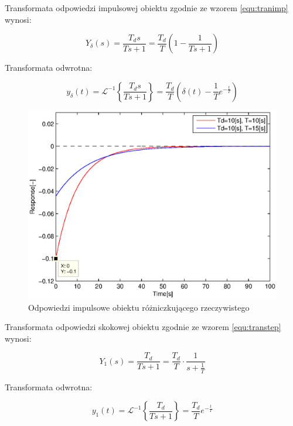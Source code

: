 \documentclass[12pt]{article}
\begin{document}
Transformata odpowiedzi impulsowej obiektu zgodnie ze wzorem \eqref{equ:tranimp}
wynosi:

\begin{equation*}
	Y_{\delta}(s)=\frac{T_ds}{Ts+1}=
	\frac{T_d}{T}\left(1 - \frac{1}{Ts+1}\right)
\end{equation*}

Transformata odwrotna:

\begin{equation*}
	y_{\delta}(t)=\mathcal{L}^{-1}\left\{\frac{T_ds}{Ts+1}\right\} =
	\frac{T_d}{T}\left(\delta(t)-\frac{1}{T}e^{-\frac{t}{T}}\right)
\end{equation*}

\begin{figure}[!htb]
	\begin{center}
		\includegraphics[width=14cm]{../res/img/imp5.eps}
	\end{center}
	\caption{Odpowiedzi impulsowe obiektu różniczkującego rzeczywistego}
\end{figure}

\newpage

Transformata odpowiedzi skokowej obiektu zgodnie ze wzorem \eqref{equ:transtep}
wynosi:

\begin{equation*}
	Y_{1}(s)=\frac{T_d}{Ts+1}=\frac{T_d}{T}\cdot \frac{1}{s+\frac{1}{T}}
\end{equation*}

Transformata odwrotna:

\begin{equation*}
	y_{1}(t)=\mathcal{L}^{-1}\left\{\frac{T_d}{Ts+1}\right\} =
	\frac{T_d}{T}e^{-\frac{t}{T}}
\end{equation*}
\end{document}
